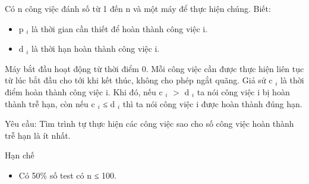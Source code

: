 Có n công việc đánh số từ 1 đến n và một máy để thực hiện chúng. Biết:  
\begin{itemize}
	\item     p    $_     i    $    là thời gian cần thiết để hoàn thành công việc i.   
	\item     d    $_     i    $    là thời hạn hoàn thành công việc i.   
\end{itemize}

   Máy bắt đầu hoạt động từ thời điểm 0. Mỗi công việc cần được thực hiện liên tục từ lúc bắt đầu cho tới khi kết thúc, không cho phép ngắt quãng. Giả sử c   $_    i   $   là thời điểm hoàn thành công việc i. Khi đó, nếu c   $_    i   $   $>$  d   $_    i   $   ta nói công việc i bị hoàn thành trễ hạn, còn nếu  c   $_    i   $   ≤ d   $_    i   $   thì ta nói công việc i được hoàn thành đúng hạn.  

   Yêu cầu: Tìm trình tự thực hiện các công việc sao cho số công việc hoàn thành trễ hạn là ít nhất.  

Hạn chế
\begin{itemize}
	\item     Có 50\% số test có n ≤ 100.   
\end{itemize}